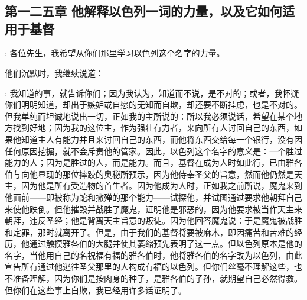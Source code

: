 

\section{}


\subsection{第一二五章 他解释以色列一词的力量，以及它如何适用于基督}

: 各位先生，我希望从你们那里学习以色列这个名字的力量。\par

他们沉默时，我继续说道：\par

: 我知道的事，就告诉你们；因为我认为，知道而不说，是不对的；或者，我怀疑你们明明知道，却出于嫉妒或自愿的无知而自欺，却还要不断挂虑，也是不对的。但我单纯而坦诚地说出一切，正如我的主所说的：\newline{}所以我必须说话，希望在某个地方找到好地；因为我的这位主，作为强壮有力者，来向所有人讨回自己的东西，如果他知道主人有能力并且来讨回自己的东西，而他将东西交给每一个银行，没有因任何原因挖掘，就不会斥责他的管家。因此，以色列这个名字的意义是：一个胜过能力的人；因为是胜过的人，而是能力。而且，基督在成为人时如此行，已由雅各伯与向他显现的那位摔跤的奥秘所预示，因为他侍奉圣父的旨意，然而他仍然是天主，因为他是所有受造物的首生者。因为他成为人时，正如我之前所说，魔鬼来到他面前——即被称为蛇和撒殚的那个能力——试探他，并试图通过要求他朝拜自己来使他跌倒。但他摧毁并战胜了魔鬼，证明他是邪恶的，因为他要求被当作天主来朝拜，违反圣经；他是背离天主旨意的叛徒。因为他回答魔鬼说：\newline{}于是魔鬼被战胜和定罪，那时就离开了。但是，由于我们的基督将要被麻木，即因痛苦和苦难的经历，他通过触摸雅各伯的大腿并使其萎缩预先表明了这一点。但以色列原本是他的名字，当他用自己的名祝福有福的雅各伯时，他将雅各伯的名字改为以色列，由此宣告所有通过他逃往圣父那里的人构成有福的以色列。但你们丝毫不理解这些，也不准备理解，因为你们是按肉身的种子，是雅各伯的子孙，就期望自己必然得救。但你们在这些事上自欺，我已经用许多话证明了。\par

